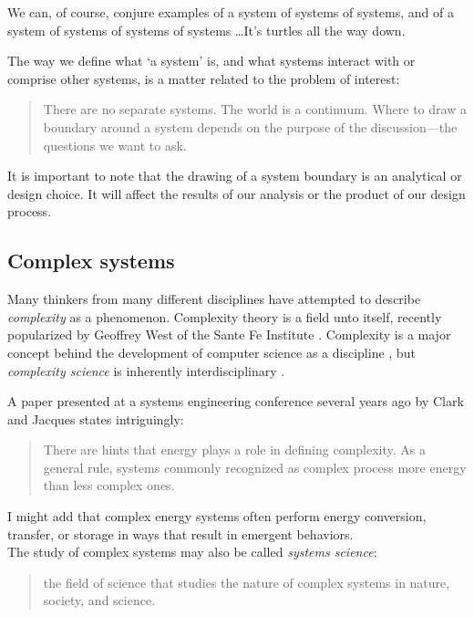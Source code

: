 \documentclass[10pt]{article}
\begin{document}
We can, of course, conjure examples of a system of systems of systems, and of a system of systems of systems of systems \ldots It's turtles all the way down.

The way we define what `a system' is, and what systems interact with or comprise other systems, is a matter related to the problem of interest:

\begin{quote}
    There are no separate systems. The world is a continuum. Where to draw a boundary around a system depends on the purpose of the discussion---the questions we want to ask. \cite{meadows}
\end{quote}

It is important to note that the drawing of a system boundary is an analytical or design choice. It will affect the results of our analysis or the product of our design process.

\subsection{Complex systems}

Many thinkers from many different disciplines have attempted to describe \textit{complexity} as a phenomenon. Complexity theory is a field unto itself, recently popularized by Geoffrey West of the Sante Fe Institute \cite{scale}. Complexity is a major concept behind the development of computer science as a discipline \cite{Hartmanis1994-sq}, but \textit{complexity science} is inherently interdisciplinary \cite{Downey2012-ce}.

A paper presented at a systems engineering conference several years ago by Clark and Jacques states intriguingly:

\begin{quote}
There are hints that energy plays a role in defining complexity. As a general rule, systems commonly  recognized as complex process more energy than less complex ones. \cite{Clark2012-bm}
\end{quote}

I might add that complex energy systems often perform energy conversion, transfer, or storage in ways that result in emergent behaviors.\\

The study of complex systems may also be called \textit{systems science}: \begin{quote}
    the field of science that studies the nature of complex systems in nature, society, and science. \cite{noauthor_undated-rd}
\end{quote}
\end{document}
